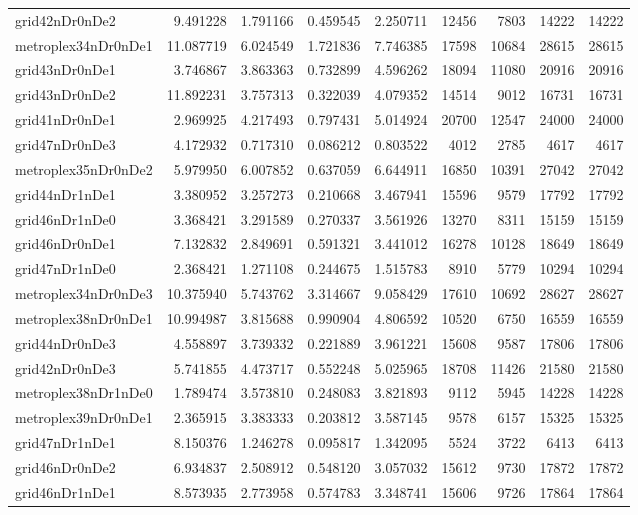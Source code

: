\begin{longtable}{|l|r|r|r|r|r|r|r|r|}
grid42nDr0nDe2 & 9.491228 & 1.791166 & 0.459545 & 2.250711 & 12456 & 7803 & 14222 & 14222 \\
metroplex34nDr0nDe1 & 11.087719 & 6.024549 & 1.721836 & 7.746385 & 17598 & 10684 & 28615 & 28615 \\
grid43nDr0nDe1 & 3.746867 & 3.863363 & 0.732899 & 4.596262 & 18094 & 11080 & 20916 & 20916 \\
grid43nDr0nDe2 & 11.892231 & 3.757313 & 0.322039 & 4.079352 & 14514 & 9012 & 16731 & 16731 \\
grid41nDr0nDe1 & 2.969925 & 4.217493 & 0.797431 & 5.014924 & 20700 & 12547 & 24000 & 24000 \\
grid47nDr0nDe3 & 4.172932 & 0.717310 & 0.086212 & 0.803522 & 4012 & 2785 & 4617 & 4617 \\
metroplex35nDr0nDe2 & 5.979950 & 6.007852 & 0.637059 & 6.644911 & 16850 & 10391 & 27042 & 27042 \\
grid44nDr1nDe1 & 3.380952 & 3.257273 & 0.210668 & 3.467941 & 15596 & 9579 & 17792 & 17792 \\
grid46nDr1nDe0 & 3.368421 & 3.291589 & 0.270337 & 3.561926 & 13270 & 8311 & 15159 & 15159 \\
grid46nDr0nDe1 & 7.132832 & 2.849691 & 0.591321 & 3.441012 & 16278 & 10128 & 18649 & 18649 \\
grid47nDr1nDe0 & 2.368421 & 1.271108 & 0.244675 & 1.515783 & 8910 & 5779 & 10294 & 10294 \\
metroplex34nDr0nDe3 & 10.375940 & 5.743762 & 3.314667 & 9.058429 & 17610 & 10692 & 28627 & 28627 \\
metroplex38nDr0nDe1 & 10.994987 & 3.815688 & 0.990904 & 4.806592 & 10520 & 6750 & 16559 & 16559 \\
grid44nDr0nDe3 & 4.558897 & 3.739332 & 0.221889 & 3.961221 & 15608 & 9587 & 17806 & 17806 \\
grid42nDr0nDe3 & 5.741855 & 4.473717 & 0.552248 & 5.025965 & 18708 & 11426 & 21580 & 21580 \\
metroplex38nDr1nDe0 & 1.789474 & 3.573810 & 0.248083 & 3.821893 & 9112 & 5945 & 14228 & 14228 \\
metroplex39nDr0nDe1 & 2.365915 & 3.383333 & 0.203812 & 3.587145 & 9578 & 6157 & 15325 & 15325 \\
grid47nDr1nDe1 & 8.150376 & 1.246278 & 0.095817 & 1.342095 & 5524 & 3722 & 6413 & 6413 \\
grid46nDr0nDe2 & 6.934837 & 2.508912 & 0.548120 & 3.057032 & 15612 & 9730 & 17872 & 17872 \\
grid46nDr1nDe1 & 8.573935 & 2.773958 & 0.574783 & 3.348741 & 15606 & 9726 & 17864 & 17864 \\

\end{longtable}
